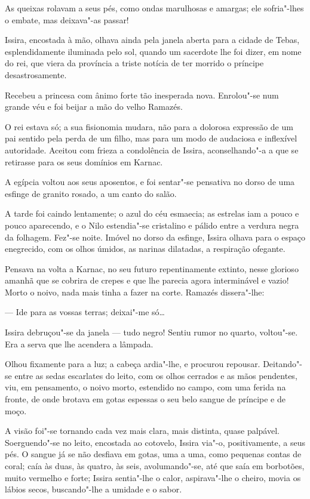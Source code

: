 As queixas rolavam a seus pés, como ondas marulhosas e amargas; ele
sofria"-lhes o embate, mas deixava"-as passar!

Issira, encostada à mão, olhava ainda pela janela aberta para a cidade
de Tebas, esplendidamente iluminada pelo sol, quando um sacerdote lhe
foi dizer, em nome do rei, que viera da província a triste notícia de
ter morrido o príncipe desastrosamente.

Recebeu a princesa com ânimo forte tão inesperada nova. Enrolou"-se num
grande véu e foi beijar a mão do velho Ramazés.

O rei estava só; a sua fisionomia mudara, não para a dolorosa expressão
de um pai sentido pela perda de um filho, mas para um modo de audaciosa
e inflexível autoridade. Aceitou com frieza a condolência de Issira,
aconselhando"-a a que se retirasse para os seus domínios em Karnac.

A egípcia voltou aos seus aposentos, e foi sentar"-se pensativa no dorso
de uma esfinge de granito rosado, a um canto do salão.

A tarde foi caindo lentamente; o azul do céu esmaecia; as estrelas iam a
pouco e pouco aparecendo, e o Nilo estendia"-se cristalino e pálido entre
a verdura negra da folhagem. Fez"-se noite. Imóvel no dorso da esfinge,
Issira olhava para o espaço enegrecido, com os olhos úmidos, as narinas
dilatadas, a respiração ofegante.

Pensava na volta a Karnac, no seu futuro repentinamente extinto, nesse
glorioso amanhã que se cobrira de crepes e que lhe parecia agora
interminável e vazio! Morto o noivo, nada mais tinha a fazer na corte.
Ramazés dissera"-lhe:

--- Ide para as vossas terras; deixai"-me só\ldots{}

Issira debruçou"-se da janela --- tudo negro! Sentiu rumor no quarto,
voltou"-se. Era a serva que lhe acendera a lâmpada.

Olhou fixamente para a luz; a cabeça ardia"-lhe, e procurou repousar.
Deitando"-se entre as sedas escarlates do leito, com os olhos cerrados e
as mãos pendentes, viu, em pensamento, o noivo morto, estendido no
campo, com uma ferida na fronte, de onde brotava em gotas espessas o seu
belo sangue de príncipe e de moço.

A visão foi"-se tornando cada vez mais clara, mais distinta, quase
palpável. Soerguendo"-se no leito, encostada ao cotovelo, Issira via"-o,
positivamente, a seus pés. O sangue já se não desfiava em gotas, uma a
uma, como pequenas contas de coral; caía às duas, às quatro, às seis,
avolumando"-se, até que saía em borbotões, muito vermelho e forte; Issira
sentia"-lhe o calor, aspirava"-lhe o cheiro, movia os lábios secos,
buscando"-lhe a umidade e o sabor.

